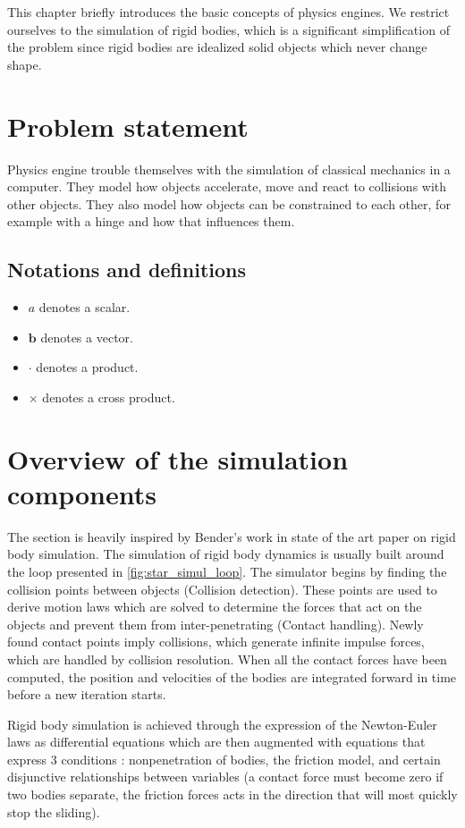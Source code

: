 This chapter briefly introduces the basic concepts of physics engines. We restrict ourselves to the simulation of rigid bodies, which is a significant simplification of the problem since rigid bodies are idealized solid objects which never change shape.

\section{Problem statement}
Physics engine trouble themselves with the simulation of classical mechanics in a computer. They model how objects accelerate, move and react to collisions with other objects. They also model how objects can be constrained to each other, for example with a hinge and how that influences them.

\subsection{Notations and definitions}
\begin{itemize}
\item $a$ denotes a scalar.
\item $\mathbf{b}$ denotes a vector.
\item $\cdot$ denotes a product.
\item $\times$ denotes a cross product.
\end{itemize}

\section{Overview of the simulation components}
The section is heavily inspired by Bender's work in \cite{BETC2012} state of the art paper on rigid body simulation. The simulation of rigid body dynamics is usually built around the loop presented in \cref{fig:star_simul_loop}. The simulator begins by finding the collision points between objects (Collision detection). These points are used to derive motion laws which are solved to determine the forces that act on the objects and prevent them from inter-penetrating (Contact handling). Newly found contact points imply collisions, which generate infinite impulse forces, which are handled by collision resolution. When all the contact forces have been computed, the position and velocities of the bodies are integrated forward in time before a new iteration starts.

Rigid body simulation is achieved through the expression of the Newton-Euler laws as differential equations which are then augmented with equations that express 3 conditions : nonpenetration of bodies, the friction model, and certain disjunctive relationships between variables (a contact force must become zero if two bodies separate, the friction forces acts in the direction that will most quickly stop the sliding).

